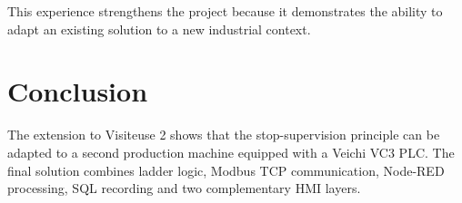 This experience strengthens the project because it demonstrates the ability to adapt an existing solution to a new industrial context.

\section*{Conclusion}
The extension to Visiteuse 2 shows that the stop-supervision principle can be adapted to a second production machine equipped with a Veichi VC3 PLC. The final solution combines ladder logic, Modbus TCP communication, Node-RED processing, SQL recording and two complementary HMI layers.
